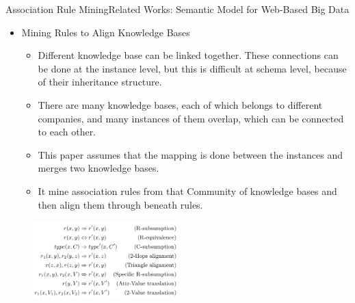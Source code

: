 \documentclass[10pt]{beamer}
\begin{document}
\begin{frame}{Association Rule Mining}{Related Works: Semantic Model for Web-Based Big Data}
\begin{itemize}
\item Mining Rules to Align Knowledge Bases \cite{galarraga2013mining}
\begin{itemize}
\item Different knowledge base can be linked together. These connections can be done at the instance level, but this is difficult at schema level, because of their inheritance structure.
\item There are many knowledge bases, each of which belongs to different companies, and many instances of them overlap, which can be connected to each other.
\item This paper assumes that the mapping is done between the instances and merges two knowledge bases.
\item It mine association rules from that Community of knowledge bases and then align them through beneath rules.
\end{itemize}
\end{itemize}

\begin{figure}[H]
	\centering
	\includegraphics[width=0.5\textwidth]{images/Rosa.PNG}
	\label{fig:Rosa}
\end{figure}
\end{frame}
\end{document}
